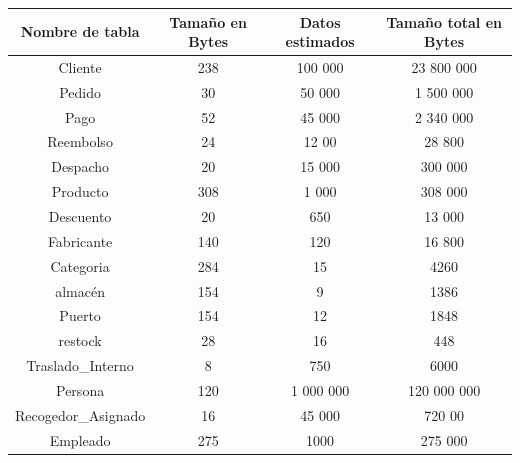 \documentclass[10pt, a4paper,openany]{report}
\begin{document}
\begin{table}[h]
	\label{tab:Tamaño de las tablas fijas}
	\begin{center}
		\begin{tabular}[c]{|c|c|c|c|}
			\hline
			\multicolumn{1}{|c|}{\textbf{Nombre de tabla}} &
			\multicolumn{1}{c}{\textbf{Tamaño en Bytes}}   &
			\multicolumn{1}{|c|}{\textbf{Datos estimados}} &
			\multicolumn{1}{|c|}{\textbf{Tamaño total en Bytes}}                           \\
			\hline
			Cliente                                        & 238 & 100 000   & 23 800 000  \\
			\hline
			Pedido                                         & 30  & 50 000    & 1 500 000   \\
			\hline
			Pago                                           & 52  & 45 000    & 2 340 000   \\
			\hline
			Reembolso                                      & 24  & 12 00     & 28 800      \\
			\hline
			Despacho                                       & 20  & 15 000    & 300 000     \\
			\hline
			Producto                                       & 308 & 1 000     & 308 000     \\
			\hline
			Descuento                                      & 20  & 650       & 13 000      \\
			\hline
			Fabricante                                     & 140 & 120       & 16 800      \\
			\hline
			Categoria                                      & 284 & 15        & 4260        \\
			\hline
			almacén                                        & 154 & 9         & 1386        \\
			\hline
			Puerto                                         & 154 & 12        & 1848        \\
			\hline
			restock                                        & 28  & 16        & 448         \\
			\hline
			Traslado\_Interno                              & 8   & 750       & 6000        \\
			\hline
			Persona                                        & 120 & 1 000 000 & 120 000 000 \\
			\hline
			Recogedor\_Asignado                            & 16  & 45 000    & 720 00      \\
			\hline
			Empleado                                       & 275 & 1000      & 275 000     \\

\end{tabular}
\end{center}
\end{table}
\end{document}
